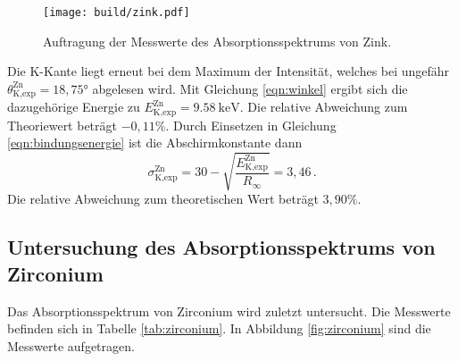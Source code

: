 \begin{figure}
  \centering
  \texttt{[image: build/zink.pdf]}
  \caption{Auftragung der Messwerte des Absorptionsspektrums von Zink.}
  \label{fig:zink}
\end{figure}

Die K-Kante liegt erneut bei dem Maximum der Intensität, welches bei ungefähr
$\theta_{\text{K,exp}}^{\text{Zn}} = 18{,}75°$ abgelesen wird. Mit Gleichung \eqref{eqn:winkel} ergibt sich die dazugehörige Energie
zu $E_{\text{K,exp}}^{\text{Zn}} = \SI{9.58}{\kilo\electronvolt}$.
Die relative Abweichung zum Theoriewert beträgt $-0{,}11\%$. Durch Einsetzen in Gleichung \eqref{eqn:bindungsenergie}
ist die Abschirmkonstante dann
\begin{equation*}
  \sigma_{\text{K,exp}}^{\text{Zn}} =  30 - \sqrt{\frac{E_{\text{K,exp}}^{\text{Zn}}}{R_\infty}} = 3{,}46\,.
\end{equation*}
Die relative Abweichung zum theoretischen Wert beträgt $3{,}90\%$.

\subsection{Untersuchung des Absorptionsspektrums von Zirconium}
\label{subsec:zirconium}

Das Absorptionsspektrum von Zirconium wird zuletzt untersucht.
Die Messwerte befinden sich in Tabelle \ref{tab:zirconium}.
In Abbildung \ref{fig:zirconium} sind die Messwerte aufgetragen.

